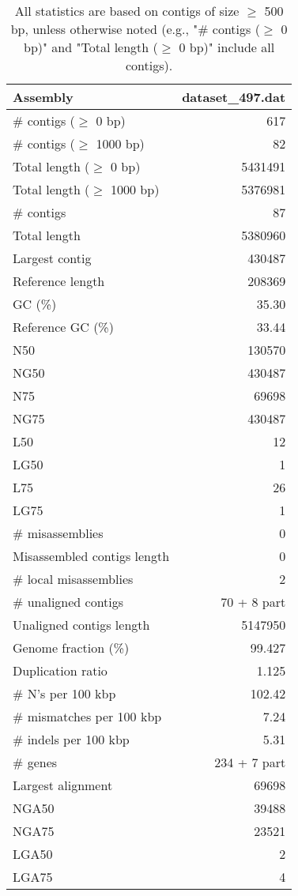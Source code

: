 \documentclass[12pt,a4paper]{article}
\begin{document}
\begin{table}[ht]
\begin{center}
\caption{All statistics are based on contigs of size $\geq$ 500 bp, unless otherwise noted (e.g., "\# contigs ($\geq$ 0 bp)" and "Total length ($\geq$ 0 bp)" include all contigs).}
\begin{tabular}{|l*{1}{|r}|}
\hline
Assembly & dataset\_497.dat \\ \hline
\# contigs ($\geq$ 0 bp) & 617 \\ \hline
\# contigs ($\geq$ 1000 bp) & 82 \\ \hline
Total length ($\geq$ 0 bp) & 5431491 \\ \hline
Total length ($\geq$ 1000 bp) & 5376981 \\ \hline
\# contigs & 87 \\ \hline
Total length & 5380960 \\ \hline
Largest contig & 430487 \\ \hline
Reference length & 208369 \\ \hline
GC (\%) & 35.30 \\ \hline
Reference GC (\%) & 33.44 \\ \hline
N50 & 130570 \\ \hline
NG50 & 430487 \\ \hline
N75 & 69698 \\ \hline
NG75 & 430487 \\ \hline
L50 & 12 \\ \hline
LG50 & 1 \\ \hline
L75 & 26 \\ \hline
LG75 & 1 \\ \hline
\# misassemblies & 0 \\ \hline
Misassembled contigs length & 0 \\ \hline
\# local misassemblies & 2 \\ \hline
\# unaligned contigs & 70 + 8 part \\ \hline
Unaligned contigs length & 5147950 \\ \hline
Genome fraction (\%) & 99.427 \\ \hline
Duplication ratio & 1.125 \\ \hline
\# N's per 100 kbp & 102.42 \\ \hline
\# mismatches per 100 kbp & 7.24 \\ \hline
\# indels per 100 kbp & 5.31 \\ \hline
\# genes & 234 + 7 part \\ \hline
Largest alignment & 69698 \\ \hline
NGA50 & 39488 \\ \hline
NGA75 & 23521 \\ \hline
LGA50 & 2 \\ \hline
LGA75 & 4 \\ \hline
\end{tabular}
\end{center}
\end{table}
\end{document}
